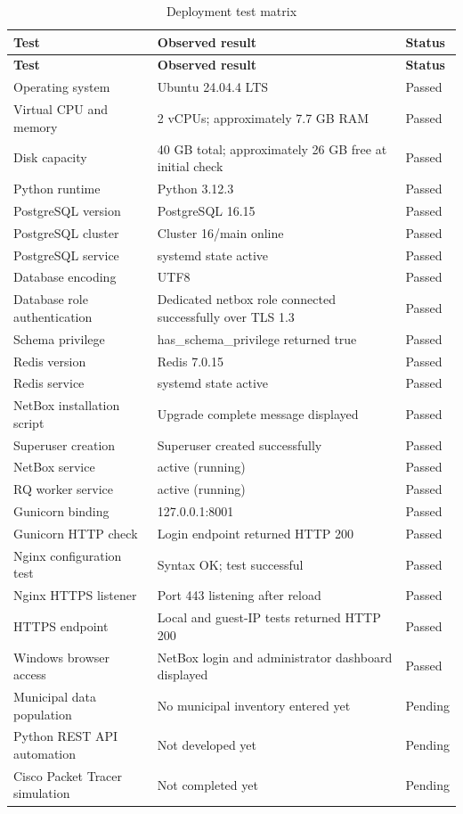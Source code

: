 \documentclass[11pt,a4paper,oneside]{report}
\begin{document}
\begin{longtable}{L{0.26\textwidth}L{0.48\textwidth}L{0.15\textwidth}}
\caption{Deployment test matrix}\\
\toprule
\textbf{Test} & \textbf{Observed result} & \textbf{Status}\\
\midrule
\endfirsthead
\toprule
\textbf{Test} & \textbf{Observed result} & \textbf{Status}\\
\midrule
\endhead
Operating system & Ubuntu 24.04.4 LTS & Passed\\
Virtual CPU and memory & 2 vCPUs; approximately 7.7 GB RAM & Passed\\
Disk capacity & 40 GB total; approximately 26 GB free at initial check & Passed\\
Python runtime & Python 3.12.3 & Passed\\
PostgreSQL version & PostgreSQL 16.15 & Passed\\
PostgreSQL cluster & Cluster 16/main online & Passed\\
PostgreSQL service & systemd state active & Passed\\
Database encoding & UTF8 & Passed\\
Database role authentication & Dedicated netbox role connected successfully over TLS 1.3 & Passed\\
Schema privilege & has\_schema\_privilege returned true & Passed\\
Redis version & Redis 7.0.15 & Passed\\
Redis service & systemd state active & Passed\\
NetBox installation script & Upgrade complete message displayed & Passed\\
Superuser creation & Superuser created successfully & Passed\\
NetBox service & active (running) & Passed\\
RQ worker service & active (running) & Passed\\
Gunicorn binding & 127.0.0.1:8001 & Passed\\
Gunicorn HTTP check & Login endpoint returned HTTP 200 & Passed\\
Nginx configuration test & Syntax OK; test successful & Passed\\
Nginx HTTPS listener & Port 443 listening after reload & Passed\\
HTTPS endpoint & Local and guest-IP tests returned HTTP 200 & Passed\\
Windows browser access & NetBox login and administrator dashboard displayed & Passed\\
Municipal data population & No municipal inventory entered yet & Pending\\
Python REST API automation & Not developed yet & Pending\\
Cisco Packet Tracer simulation & Not completed yet & Pending\\
\bottomrule
\end{longtable}
\end{document}
